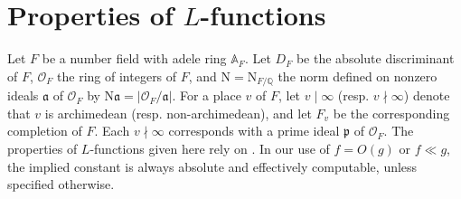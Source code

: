 \documentclass[12pt,reqno]{amsart}
\theoremstyle{remark}
\newcommand{\N}{\mathrm{N}}
\newcommand{\A}{\mathbb{A}}
\newcommand{\Q}{\mathbb{Q}}
\newcommand{\ka}{\mathfrak{a}}
\newcommand{\kp}{\mathfrak{p}}
\newcommand{\cO}{\mathcal{O}}
\numberwithin{equation}{section}
\begin{document}
	
	
	
	\section{Properties of \texorpdfstring{$L$}{L}-functions}
	\label{sec:L-functions}



	
	
	

    Let $F$ be a number field with adele ring $\A_F$. Let $D_F$ be the absolute discriminant of $F$, $\cO_F$ the ring of integers of $F$, and $\N=\N_{F/\Q}$ the norm defined on nonzero ideals $\ka$ of $\cO_F$ by $\N\ka=|\cO_F/\ka|$. For a place $v$ of $F$, let $v\mid\infty$ (resp. $v\nmid\infty$) denote that $v$ is archimedean (resp. non-archimedean), and let $F_v$ be the corresponding completion of $F$. Each $v\nmid\infty$ corresponds with a prime ideal $\kp$ of $\cO_F$. The properties of $L$-functions given here rely on \cite{GJ,JPS,MW}.  In our use of $f=O(g)$ or $f\ll g$, the implied constant is always absolute and effectively computable, unless specified otherwise.
    
\end{document}
